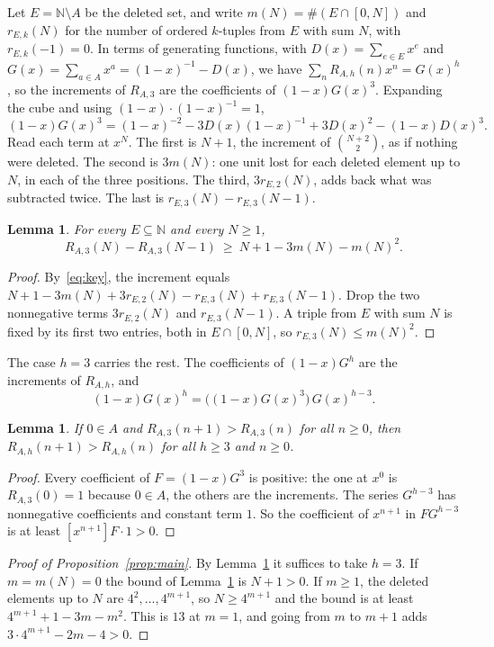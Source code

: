 \documentclass[11pt]{amsart}
\newtheorem{lemma}[theorem]{Lemma}
\theoremstyle{remark}
\newcommand{\N}{\mathbb{N}}
\begin{document}
Let $E=\N\setminus A$ be the deleted set, and write $m(N)=\#(E\cap[0,N])$ and $r_{E,k}(N)$ for the number of ordered $k$-tuples from $E$ with sum $N$, with $r_{E,k}(-1)=0$. In terms of generating functions, with $D(x)=\sum_{e\in E}x^e$ and $G(x)=\sum_{a\in A}x^a=(1-x)^{-1}-D(x)$, we have $\sum_n R_{A,h}(n)x^n=G(x)^h$, so the increments of $R_{A,3}$ are the coefficients of $(1-x)G(x)^3$. Expanding the cube and using $(1-x)\cdot(1-x)^{-1}=1$,
\begin{equation}\label{eq:key}
(1-x)G(x)^3=(1-x)^{-2}-3D(x)(1-x)^{-1}+3D(x)^2-(1-x)D(x)^3 .
\end{equation}
Read each term at $x^N$. The first is $N+1$, the increment of $\binom{N+2}{2}$, as if nothing were deleted. The second is $3m(N)$: one unit lost for each deleted element up to $N$, in each of the three positions. The third, $3r_{E,2}(N)$, adds back what was subtracted twice. The last is $r_{E,3}(N)-r_{E,3}(N-1)$.

\begin{lemma}\label{lem:bound}
For every $E\subseteq\N$ and every $N\ge1$,
\[
R_{A,3}(N)-R_{A,3}(N-1)\ \ge\ N+1-3m(N)-m(N)^2 .
\]
\end{lemma}

\begin{proof}
By~\eqref{eq:key}, the increment equals $N+1-3m(N)+3r_{E,2}(N)-r_{E,3}(N)+r_{E,3}(N-1)$. Drop the two nonnegative terms $3r_{E,2}(N)$ and $r_{E,3}(N-1)$. A triple from $E$ with sum $N$ is fixed by its first two entries, both in $E\cap[0,N]$, so $r_{E,3}(N)\le m(N)^2$.
\end{proof}

The case $h=3$ carries the rest. The coefficients of $(1-x)G^h$ are the increments of $R_{A,h}$, and
\[
(1-x)G(x)^h=\bigl((1-x)G(x)^3\bigr)\,G(x)^{h-3}.
\]
\begin{lemma}\label{lem:reduce}
If $0\in A$ and $R_{A,3}(n+1)>R_{A,3}(n)$ for all $n\ge0$, then $R_{A,h}(n+1)>R_{A,h}(n)$ for all $h\ge3$ and $n\ge0$.
\end{lemma}

\begin{proof}
Every coefficient of $F=(1-x)G^3$ is positive: the one at $x^0$ is $R_{A,3}(0)=1$ because $0\in A$, the others are the increments. The series $G^{h-3}$ has nonnegative coefficients and constant term $1$. So the coefficient of $x^{n+1}$ in $FG^{h-3}$ is at least $[x^{n+1}]F\cdot1>0$.
\end{proof}

\begin{proof}[Proof of Proposition~\ref{prop:main}]
By Lemma~\ref{lem:reduce} it suffices to take $h=3$. If $m=m(N)=0$ the bound of Lemma~\ref{lem:bound} is $N+1>0$. If $m\ge1$, the deleted elements up to $N$ are $4^2,\dots,4^{m+1}$, so $N\ge4^{m+1}$ and the bound is at least $4^{m+1}+1-3m-m^2$. This is $13$ at $m=1$, and going from $m$ to $m+1$ adds $3\cdot4^{m+1}-2m-4>0$.
\end{proof}
\end{document}
